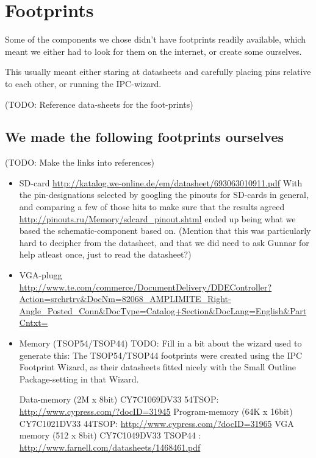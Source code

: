 \section {Footprints}
Some of the components we chose didn't have footprints readily available,
which meant we either had to look for them on the internet, or create some
ourselves.

This usually meant either staring at datasheets and carefully placing pins relative
to each other, or running the IPC-wizard.

(TODO: Reference data-sheets for the foot-prints)

\subsection {We made the following footprints ourselves}
(TODO: Make the links into references)
\begin {itemize}
\item SD-card \url{http://katalog.we-online.de/em/datasheet/693063010911.pdf}
With the pin-designations selected by googling the pinouts for SD-cards in general, and
comparing a few of those hits to make sure that the results agreed \url{http://pinouts.ru/Memory/sdcard_pinout.shtml}
ended up being what we based the schematic-component based on. (Mention that this was
particularly hard to decipher from the datasheet, and that we did need to ask Gunnar for
help atleast once, just to read the datasheet?)
\item VGA-plugg \url{http://www.te.com/commerce/DocumentDelivery/DDEController?Action=srchrtrv&DocNm=82068_AMPLIMITE_Right-Angle_Posted_Conn&DocType=Catalog+Section&DocLang=English&PartCntxt=}
\item Memory (TSOP54/TSOP44)
TODO: Fill in a bit about the wizard used to generate this:
The TSOP54/TSOP44 footprints were created using the IPC Footprint Wizard, as their datasheets fitted
nicely with the Small Outline Package-setting in that Wizard.

Data-memory (2M x 8bit) CY7C1069DV33  54TSOP: \url{http://www.cypress.com/?docID=31945}
Program-memory (64K x 16bit) CY7C1021DV33  44TSOP: \url{http://www.cypress.com/?docID=31965}
VGA memory (512 x 8bit) CY7C1049DV33 TSOP44 : \url{http://www.farnell.com/datasheets/1468461.pdf}
\end {itemize}


